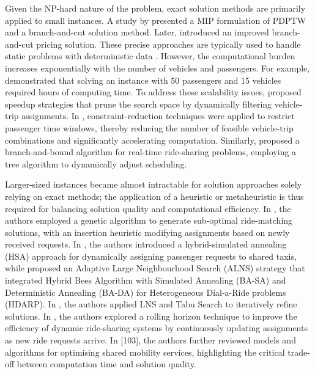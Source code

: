 Given the NP-hard nature of the problem, exact solution methods are primarily applied to small instances. A study by \cite{cordeau2007dial46} presented a MIP formulation of PDPTW and a branch-and-cut solution method. Later, \cite{ropke2009branch148} introduced an improved branch-and-cut pricing solution. These precise approaches are typically used to handle static problems with deterministic data \cite{cordeau2007dial46, baldacci2004exact24, ghilas2018branch65}. However, the computational burden increases exponentially with the number of vehicles and passengers. For example, \cite{mahmoudi2016optimal122} demonstrated that solving an instance with 50 passengers and 15 vehicles required hours of computing time. To address these scalability issues, \cite{gao2017efficient, shen2016dynamic} proposed speedup strategies that prune the search space by dynamically filtering vehicle-trip assignments. In \cite{liu2015branch114}, constraint-reduction techniques were applied to restrict passenger time windows, thereby reducing the number of feasible vehicle-trip combinations and significantly accelerating computation. Similarly, \cite{huang2013large} proposed a branch-and-bound algorithm for real-time ride-sharing problems, employing a tree algorithm to dynamically adjust scheduling.

Larger-sized instances became almost intractable for solution approaches solely relying on exact methods; the application of a heuristic or metaheuristic is thus required for balancing solution quality and computational efficiency. In \cite{herbawi2012genetic81}, the authors employed a genetic algorithm to generate sub-optimal ride-matching solutions, with an insertion heuristic modifying assignments based on newly received requests. In \cite{jung2016dynamic92}, the authors introduced a hybrid-simulated annealing (HSA) approach for dynamically assigning passenger requests to shared taxis, while \cite{huang2013large} proposed an Adaptive Large Neighbourhood Search (ALNS) strategy that integrated Hybrid Bees Algorithm with Simulated Annealing (BA-SA) and Deterministic Annealing (BA-DA) for Heterogeneous Dial-a-Ride problems (HDARP). In \cite{lu2021optimal}, the authors applied LNS and Tabu Search to iteratively refine solutions. In \cite{agatz2011dynamic7}, the authors explored a rolling horizon technique to improve the efficiency of dynamic ride-sharing systems by continuously updating assignments as new ride requests arrive. In [103], the authors further reviewed models and algorithms for optimising shared mobility services, highlighting the critical trade-off between computation time and solution quality. 

